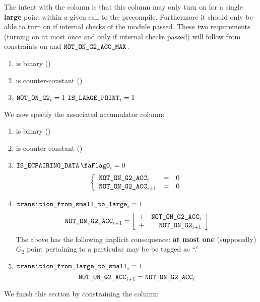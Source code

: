 The intent with the \notOnGTwo{} column is that this column may only turn on for a single \textbf{large} point within a given call to the  precompile. Furthermore it should only be able to turn on if internal checks of the module passed.
These two requirements (turning on at most once and only if internal checks passed) will follow from constraints on \notOnGTwoAcc{} and $\texttt{NOT\_ON\_G2\_ACC\_MAX}$.
\begin{enumerate}
    \item \notOnGTwo{} is binary \quad (\trash)
    \item \notOnGTwo{} is counter-constant \quad (\trash)
    \item \If $\texttt{NOT\_ON\_G2}_{i} = 1$ \Then $\texttt{IS\_LARGE\_POINT}_{i} = 1$
\end{enumerate}
We now specify the associated accumulator column:
\begin{enumerate}[resume]
    \item \notOnGTwoAcc{} is binary \quad (\trash)
    \item \notOnGTwoAcc{} is counter-constant \quad (\trash)
    \item \If $\isEcpairingData_{i} = 0$ \Then
          \[
              \left\{ \begin{array}{lcl}
                  \texttt{NOT\_ON\_G2\_ACC} _{i}     & = & 0 \\
                  \texttt{NOT\_ON\_G2\_ACC} _{i + 1} & = & 0 \\
              \end{array} \right.
          \]
    \item \If $\texttt{transition\_from\_small\_to\_large}_{i} = 1$ \Then
          \[
              \texttt{NOT\_ON\_G2\_ACC} _{i + 1} =
              \left[ \begin{array}{cr}
                      + & \texttt{NOT\_ON\_G2\_ACC} _{i}     \\
                      + & \texttt{NOT\_ON\_G2}    _{i + 1} \\
                  \end{array} \right]
          \]
          \saNote{} The above has the following implicit consequence: \textbf{at most one} (supposedly) $G_2$ point pertaining to a particular \ecdataId{} may be be tagged as ``\notOnGTwo.''
    \item \If $\texttt{transition\_from\_large\_to\_small}_{i} = 1$ \Then
          \[
              \texttt{NOT\_ON\_G2\_ACC} _{i + 1} = \texttt{NOT\_ON\_G2\_ACC} _{i}
          \]
\end{enumerate}
We finish this section by constraining the \notOnGTwoAccMax{} column:
